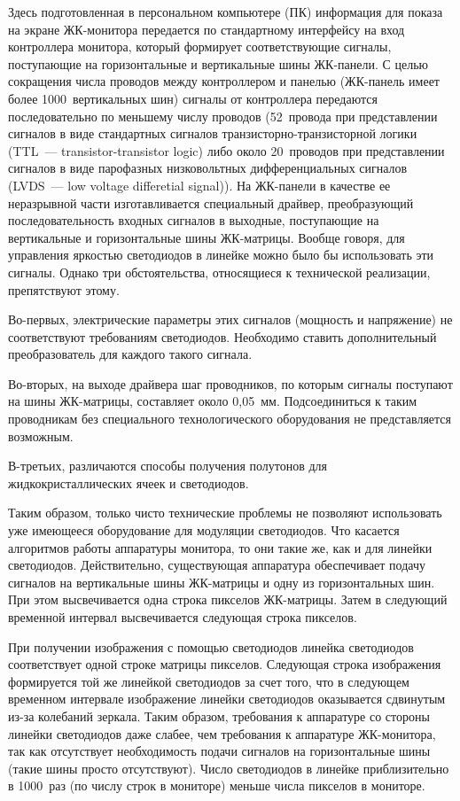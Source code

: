 \begin{multicols}{2}
  Здесь подготовленная в персональном компьютере (ПК) информация для показа на 
экране ЖК-мо\-ни\-то\-ра передается по стандартному интерфейсу на вход контроллера 
монитора, который формирует соответствующие сигналы, поступающие на 
горизонтальные и вертикальные шины ЖК-панели. С целью 
сокращения числа проводов между контроллером и панелью (ЖК-па\-нель имеет более 
1000~вертикальных шин) сигналы от контроллера передаются последовательно по 
меньшему числу проводов (52~провода при представлении сигналов в виде стандартных 
сигналов транзисторно-транзисторной логики (TTL~--- transistor-transistor logic)
либо около 20~проводов при представлении сигналов в виде 
парофазных низковольтных дифференциальных сигналов (LVDS~--- low voltage differetial signal)). 
На ЖК-па\-не\-ли в качестве ее 
неразрывной части изготавливается специальный драйвер, преобразующий 
последовательность входных сигналов в выходные, поступающие на вертикальные и 
горизонтальные шины ЖК-матрицы. Вообще говоря, для управления яркостью 
светодиодов в линейке можно было бы использовать эти сигналы. Однако три 
обстоятельства, относящиеся к технической реализации, препятствуют этому. 
  
  
  Во-первых, электрические параметры этих сигналов (мощность и напряжение) не 
соответствуют требованиям светодиодов. Необходимо ставить дополнительный 
преобразователь для каждого такого сигнала. 
  
  Во-вторых, на выходе драйвера шаг проводников, по которым сигналы поступают на 
шины ЖК-матрицы, составляет около 0,05~мм. Подсоединиться к таким проводникам без 
специального технологического оборудования не представляется возможным. 
  
  В-третьих, различаются способы получения полутонов для жидкокристаллических 
ячеек и светодиодов. 
  
  Таким образом, только чисто технические проблемы не позволяют использовать уже 
имеющееся оборудование для модуляции светодиодов. Что касается алгоритмов работы 
аппаратуры монитора, то они такие же, как и для линейки светодиодов. Действительно, 
существующая аппаратура обеспечивает подачу сигналов на вертикальные шины 
  ЖК-мат\-ри\-цы и одну из горизонтальных шин. При этом высвечивается одна строка 
пикселов ЖК-мат\-ри\-цы. Затем в следующий временной интервал высвечивается 
следующая строка пикселов. 
  
  При получении изображения с помощью светодиодов линейка светодиодов 
соответствует одной строке матрицы пикселов. Следующая строка изображения 
формируется той же линейкой светодиодов за счет того, что в следующем временном 
интервале изображение линейки светодиодов оказывается сдвинутым из-за колебаний 
зеркала. Таким образом, требования к аппаратуре со стороны линейки светодиодов даже 
слабее, чем требования к аппаратуре ЖК-монитора, так как отсутствует необходимость 
подачи сигналов на горизонтальные шины (такие шины просто отсутствуют). Число 
светодиодов в линейке приблизительно в 1000~раз (по числу строк в мониторе) меньше 
числа пикселов в мониторе. 
  

\end{multicols}
